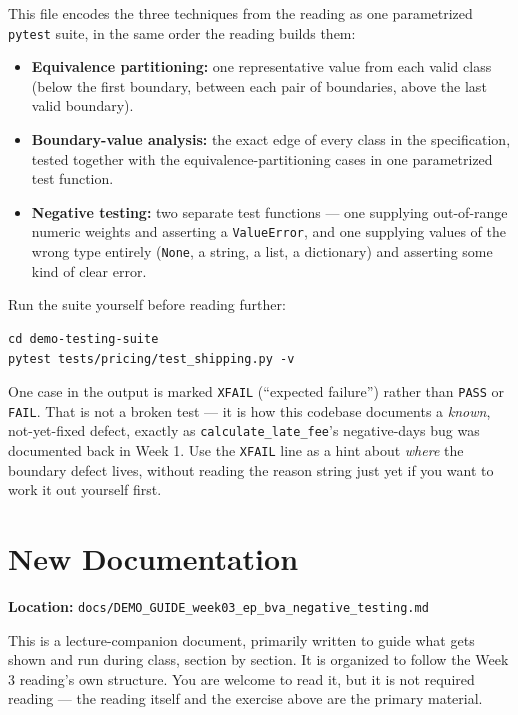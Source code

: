 \documentclass[11pt]{article}
\begin{document}
This file encodes the three techniques from the reading as one
parametrized \texttt{pytest} suite, in the same order the reading
builds them:

\begin{itemize}
\item \textbf{Equivalence partitioning:} one representative value from
each valid class (below the first boundary, between each pair of
boundaries, above the last valid boundary).
\item \textbf{Boundary-value analysis:} the exact edge of every class in
the specification, tested together with the equivalence-partitioning
cases in one parametrized test function.
\item \textbf{Negative testing:} two separate test functions --- one
supplying out-of-range numeric weights and asserting a
\texttt{ValueError}, and one supplying values of the wrong type
entirely (\texttt{None}, a string, a list, a dictionary) and asserting
some kind of clear error.
\end{itemize}

\begin{tipbox}
Run the suite yourself before reading further:
\begin{lstlisting}[style=shellstyle]
cd demo-testing-suite
pytest tests/pricing/test_shipping.py -v
\end{lstlisting}
One case in the output is marked \texttt{XFAIL} (``expected failure'')
rather than \texttt{PASS} or \texttt{FAIL}. That is not a broken test ---
it is how this codebase documents a \emph{known}, not-yet-fixed defect,
exactly as \texttt{calculate\_late\_fee}'s negative-days bug was
documented back in Week 1. Use the \texttt{XFAIL} line as a hint about
\emph{where} the boundary defect lives, without reading the reason
string just yet if you want to work it out yourself first.
\end{tipbox}

\section{New Documentation}
\textbf{Location:} \texttt{docs/DEMO\_GUIDE\_week03\_ep\_bva\_negative\_testing.md}

This is a lecture-companion document, primarily written to guide what
gets shown and run during class, section by section. It is organized to
follow the Week 3 reading's own structure. You are welcome to read it,
but it is not required reading --- the reading itself and the exercise
above are the primary material.
\end{document}
